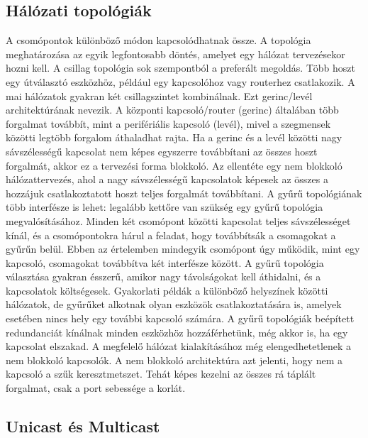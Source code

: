 \subsection{Hálózati topológiák}
A csomópontok különböző módon kapcsolódhatnak össze. A topológia meghatározása
az egyik legfontosabb döntés, amelyet egy hálózat tervezésekor hozni kell. A
csillag topológia sok szempontból a preferált megoldás. Több hoszt egy
útválasztó eszközhöz, például egy kapcsolóhoz vagy routerhez csatlakozik. A mai
hálózatok gyakran két csillagszintet kombinálnak. Ezt gerinc/levél architektúrának
nevezik. A központi kapcsoló/router (gerinc) általában több forgalmat továbbít,
mint a perifériális kapcsoló (levél), mivel a szegmensek közötti legtöbb
forgalom áthaladhat rajta. Ha a gerinc és a levél közötti nagy sávszélességű
kapcsolat nem képes egyszerre továbbítani az összes hoszt forgalmát, akkor ez a
tervezési forma blokkoló. Az ellentéte egy nem blokkoló hálózattervezés, ahol a
nagy sávszélességű kapcsolatok képesek az összes a hozzájuk csatlakoztatott
hoszt teljes forgalmát továbbítani. A gyűrű topológiának több interfésze is lehet:
legalább kettőre van szükség egy gyűrű topológia megvalósításához. Minden két
csomópont közötti kapcsolat teljes sávszélességet kínál, és a csomópontokra
hárul a feladat, hogy továbbítsák a csomagokat a gyűrűn belül. Ebben az
értelemben mindegyik csomópont úgy működik, mint egy kapcsoló, csomagokat
továbbítva két interfésze között. A gyűrű topológia választása gyakran ésszerű,
amikor nagy távolságokat kell áthidalni, és a kapcsolatok költségesek.
Gyakorlati példák a különböző helyszínek közötti hálózatok, de gyűrűket alkotnak
olyan eszközök csatlakoztatására is, amelyek esetében nincs hely egy további
kapcsoló számára. A gyűrű topológiák beépített redundanciát kínálnak minden
eszközhöz hozzáférhetünk, még akkor is, ha egy kapcsolat elszakad.
A megfelelő hálózat kialakításához még elengedhetetlenek a nem blokkoló kapcsolók.
A nem blokkoló architektúra azt jelenti, hogy nem a kapcsoló a szűk keresztmetszet.
Tehát képes kezelni az összes rá táplált forgalmat, csak a port sebessége a korlát.

\subsection{Unicast és Multicast} %

